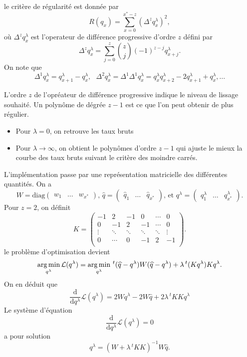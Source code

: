 le critère de régularité est donnée par 
$$
R(q_x) = \sum_{x=0}^{x^\ast-z} (\Delta^{z}q^\lambda_x)^2,
$$
où $\Delta^{z}q^\lambda_x$ est l'operateur de différence progressive d'ordre $z$ défini par 
$$
\Delta^{z}q^\lambda_x = \sum_{j=0}^z\binom{z}{j}(-1)^{z-j}q^\lambda_{x+j}.
$$
On note que 
$$
 \Delta^{1}q^\lambda_x = q^\lambda_{x+1}-q^\lambda_{x},\text{ }\Delta^{2}q^\lambda_x =\Delta^1 \Delta^1q^\lambda_x =q^\lambda_x q^\lambda_{x+2}-2q^\lambda_{x+1}+q^\lambda_{x},\ldots
$$
\begin{remark}
L'ordre $z$ de l'opréateur de différence progressive indique le niveau de lissage souhaité. Un polynôme de dégrée $z-1$ est ce que l'on peut obtenir de plus régulier. 
\begin{itemize}
  \item Pour $\lambda = 0$, on retrouve les taux bruts
  \item Pour $\lambda \rightarrow \infty$, on obtient le polynômes d'ordre $z-1$ qui ajuste le mieux la courbe des taux bruts suivant le critère des moindre carrés.
\end{itemize}
\end{remark}
L'implémentation passe par une représentation matricielle des différentes quantités. On a 
$$
W = \text{diag}\left( \begin{array}{ccc}w_1&\ldots&w_{x^\ast}\end{array}\right)\text{, }\widehat{q} = \left( \begin{array}{ccc}\widehat{q}_1&\ldots&\widehat{q}_{x^\ast}\end{array}\right)\text{, et }q^{\lambda} = \left( \begin{array}{ccc}q^{\lambda}_1&\ldots&q^{\lambda}_{x^\ast}\end{array}\right).
$$
Pour $z = 2$, on définit 
$$
K = \left(\begin{array}{cccccc}
-1&2&-1&0&\cdots&0\\
0&-1&2&-1&\cdots&0\\
\vdots&\ddots&\ddots&\ddots&\ddots&\vdots\\
0&\cdots&0&-1&2&-1\\
\end{array}\right).
$$
le problème d'optimisation devient 
$$
\operatorname*{arg\,min}_{q^\lambda} \mathcal{L}(q^\lambda)= \operatorname*{arg\,min}_{q^\lambda} \,^t(\widehat{q} - q^{\lambda})W(\widehat{q} - q^{\lambda})+\lambda\,^t(Kq^{\lambda})Kq^{\lambda}. 
$$
On en déduit que
$$
\frac{\text{d} }{\text{d} q^{\lambda}}\mathcal{L}(q^\lambda) =  2Wq^\lambda -2W\widehat{q}+2\lambda\,^tKKq^{\lambda}
$$
Le système d'équation 
$$
\frac{\text{d} }{\text{d} q^{\lambda}}\mathcal{L}(q^\lambda)=0
$$
a pour solution
$$
q^{\lambda} = \left(W + \lambda\,^tKK\right)^{-1}W\widehat{q}.
$$


